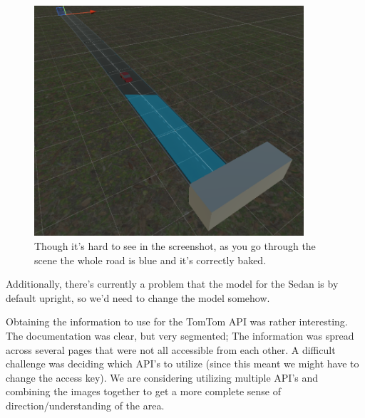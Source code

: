 \begin{figure}[!ht]
    \centering
    \includegraphics[width=10cm]{../Images/Update3/CorrectMesh.png}
       \caption{Though it's hard to see in the screenshot, as you go through the scene the whole road is blue and it's correctly baked.}
           \label{Fig: Bake Mesh Settings}
\end{figure}

\begin{flushleft}
Additionally, there's currently a problem that the model for the Sedan is by default upright, so we'd need to change the model somehow. 
\end{flushleft}

Obtaining the information to use for the TomTom API was rather interesting.
The documentation was clear, but very segmented; The information was spread across several pages that were not all accessible from each other.
A difficult challenge was deciding which API's to utilize (since this meant we might have to change the access key).
We are considering utilizing multiple API's and combining the images together to get a more complete sense of direction/understanding of the area.